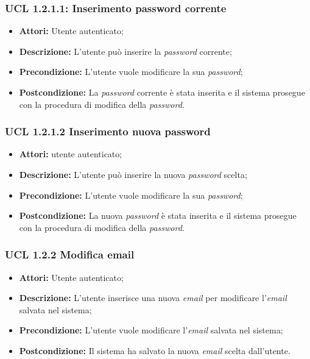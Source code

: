 \hypertarget{L1.2.1.1}{}
\subsubsection{UCL 1.2.1.1: Inserimento password corrente}
\begin{itemize}
	\item \textbf{Attori:} Utente autenticato;
	\item \textbf{Descrizione:} L'utente può inserire la \textit{password} corrente;
	\item \textbf{Precondizione:} L'utente vuole modificare la sua \textit{password};
	\item \textbf{Postcondizione:} La \textit{password} corrente è stata inserita e il sistema prosegue con la procedura di modifica della \textit{password}.
\end{itemize}

\hypertarget{L1.2.1.2}{}
\subsubsection{UCL 1.2.1.2 Inserimento nuova password}
\begin{itemize}
	\item \textbf{Attori: } utente autenticato;
	\item \textbf{Descrizione:} L'utente può inserire la nuova \textit{password} scelta;
	\item \textbf{Precondizione:} L'utente vuole modificare la sua \textit{password};
	\item \textbf{Postcondizione:} La nuova \textit{password} è stata inserita e il sistema prosegue con la procedura di modifica della \textit{password}.
\end{itemize}

\hypertarget{L1.2.2}{}
\subsubsection{UCL 1.2.2  Modifica email}
\begin{itemize}
\item \textbf{Attori:} Utente autenticato;
\item \textbf{Descrizione:} L'utente inserisce una nuova \textit{email} per modificare l'\textit{email} salvata nel sistema;
\item \textbf{Precondizione:} L'utente vuole modificare l'\textit{email} salvata nel sistema;
\item \textbf{Postcondizione:} Il sistema ha salvato la nuova \textit{email} scelta dall'utente.
\end{itemize}

